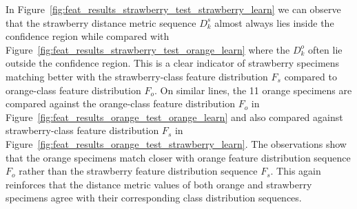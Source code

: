 In Figure~\ref{fig:feat_results_strawberry_test_strawberry_learn} we can observe that the strawberry distance metric sequence $D^s_k$ almost always lies inside the confidence region while compared with Figure~\ref{fig:feat_results_strawberry_test_orange_learn} where the $D^o_k$ often lie outside the confidence region. This is a clear indicator of strawberry specimens matching better with the strawberry-class feature distribution $F_s$ compared to orange-class feature distribution $F_o$. On similar lines, the 11 orange specimens are compared against the orange-class feature distribution $F_{o}$ in Figure~\ref{fig:feat_results_orange_test_orange_learn} and also compared against strawberry-class feature distribution $F_{s}$ in Figure~\ref{fig:feat_results_orange_test_strawberry_learn}. The observations show that the orange specimens match closer with orange feature distribution sequence $F_{o}$ rather than the strawberry feature distribution sequence $F_{s}$. This again reinforces that the distance metric 
values of both orange and strawberry specimens agree with their corresponding class distribution sequences.

